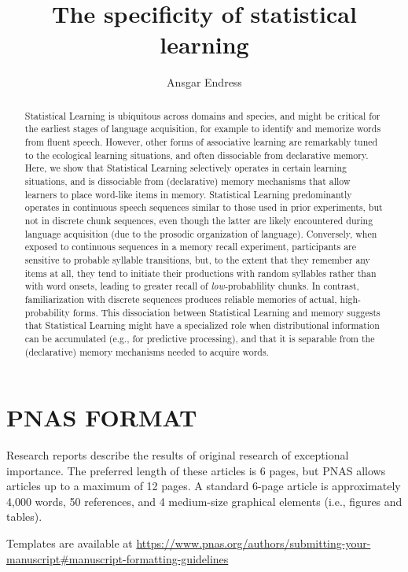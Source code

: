 \documentclass[]{article}
\title{The specificity of statistical learning}
\author{Ansgar Endress}
\date{}
\begin{document}
\maketitle
\begin{abstract}
Statistical Learning is ubiquitous across domains and species, and might be critical for the earliest stages of language acquisition, for example to identify and memorize words from fluent speech. However, other forms of associative learning are remarkably tuned to the ecological learning situations, and often dissociable from declarative memory. Here, we show that Statistical Learning selectively operates in certain learning situations, and is dissociable from (declarative) memory mechanisms that allow learners to place word-like items in memory. Statistical Learning predominantly operates in continuous speech sequences similar to those used in prior experiments, but not in discrete chunk sequences, even though the latter are likely encountered during language acquisition (due to the prosodic organization of language). Conversely, when exposed to continuous sequences in a memory recall experiment, participants are sensitive to probable syllable transitions, but, to the extent that they remember any items at all, they tend to initiate their productions with random syllables rather than with word onsets, leading to greater recall of \emph{low-}probablility chunks. In contrast, familiarization with discrete sequences produces reliable memories of actual, high-probability forms. This dissociation between Statistical Learning and memory suggests that Statistical Learning might have a specialized role when distributional information can be accumulated (e.g., for predictive processing), and that it is separable from the (declarative) memory mechanisms needed to acquire words.
\end{abstract}


\section{PNAS FORMAT}\label{pnas-format}

Research reports describe the results of original research of exceptional importance. The preferred length of these articles is 6 pages, but PNAS allows articles up to a maximum of 12 pages. A standard 6-page article is approximately 4,000 words, 50 references, and 4 medium-size graphical elements (i.e., figures and tables).

Templates are available at \url{https://www.pnas.org/authors/submitting-your-manuscript\#manuscript-formatting-guidelines}
\end{document}
